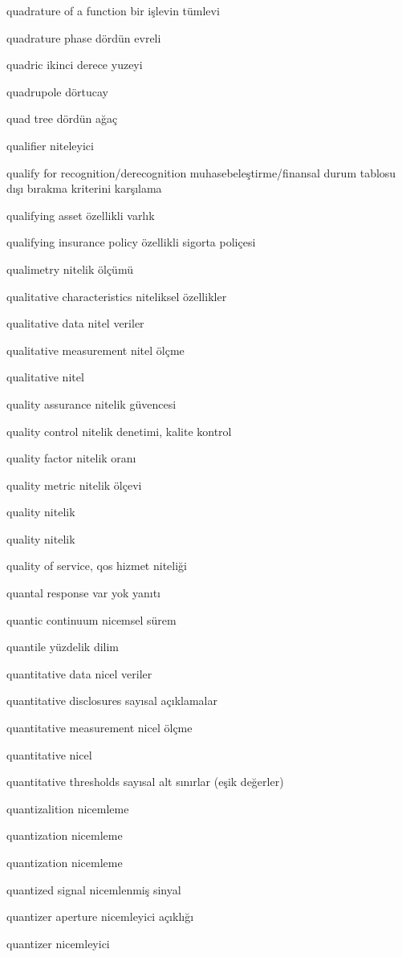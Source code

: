 \documentclass[12pt,fleqn]{article}\usepackage{../../common}
\begin{document}
quadrature of a function bir işlevin tümlevi

quadrature phase dördün evreli

quadric ikinci derece yuzeyi

quadrupole dörtucay

quad tree dördün ağaç

qualifier niteleyici

qualify for recognition/derecognition muhasebeleştirme/finansal durum tablosu dışı bırakma kriterini karşılama

qualifying asset özellikli varlık

qualifying insurance policy özellikli sigorta poliçesi

qualimetry nitelik ölçümü

qualitative characteristics niteliksel özellikler

qualitative data nitel veriler

qualitative measurement nitel ölçme

qualitative nitel

quality assurance nitelik güvencesi

quality control nitelik denetimi, kalite kontrol

quality factor nitelik oranı

quality metric nitelik ölçevi

quality nitelik

quality nitelik

quality of service, qos hizmet niteliği

quantal response var yok yanıtı

quantic continuum nicemsel sürem

quantile yüzdelik dilim

quantitative data nicel veriler

quantitative disclosures sayısal açıklamalar

quantitative measurement nicel ölçme

quantitative nicel

quantitative thresholds sayısal alt sınırlar (eşik değerler)

quantizalition nicemleme

quantization nicemleme

quantization nicemleme

quantized signal nicemlenmiş sinyal

quantizer aperture nicemleyici açıklığı

quantizer nicemleyici
\end{document}
